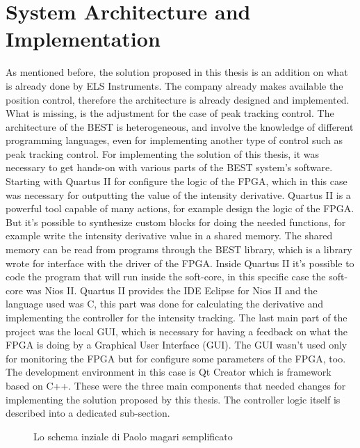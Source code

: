 \chapter{System Architecture and Implementation}\label{chap:System Architecture and Implementation}

As mentioned before, the solution proposed in this thesis is an addition on what is already done by ELS Instruments. 
The company already makes available the position control, therefore the architecture is already designed and implemented.
What is missing, is the adjustment for the case of peak tracking control.
The architecture of the BEST is heterogeneous, and involve the knowledge of different programming languages, even for implementing another type of control such as peak tracking control.
For implementing the solution of this thesis, it was necessary to get hands-on with various parts of the BEST system's software.
Starting with Quartus II for configure the logic of the FPGA, which in this case was necessary for outputting the value of the intensity derivative.
Quartus II is a powerful tool capable of many actions, for example design the logic of the FPGA.
But it's possible to synthesize custom blocks for doing the needed functions, for example write the intensity derivative value in a shared memory.
The shared memory can be read from programs through the BEST library, which is a library wrote for interface with the driver of the FPGA.
Inside Quartus II it's possible to code the program that will run inside the soft-core, in this specific case the soft-core was Nios II. 
Quartus II provides the IDE Eclipse for Nios II and the language used was C, this part was done for calculating the derivative and implementing the controller for the intensity tracking.
The last main part of the project was the local GUI, which is necessary for having a feedback on what the FPGA is doing by a Graphical User Interface (GUI).
The GUI wasn't used only for monitoring the FPGA but for configure some parameters of the FPGA, too. 
The development environment in this case is Qt Creator which is framework based on C++.
These were the three main components that needed changes for implementing the solution proposed by this thesis. 
The controller logic itself is described into a dedicated sub-section.

\begin{figure}[htbp]
    \centering
    \begin{tikzpicture}
    \end{tikzpicture}
    \caption{Lo schema inziale di Paolo magari semplificato}
    \label{fig:hw_sw_architecture}
\end{figure}


